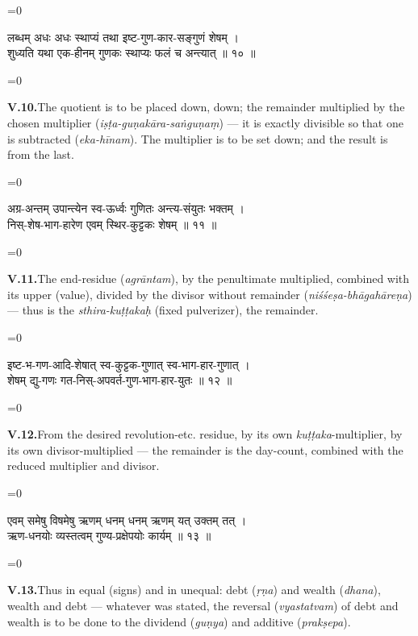 \documentclass[11pt,a4paper]{article}
\newcommand{\dev}[1]{{\devanagarifont\color{sktcolor}#1}}
\newcommand{\iast}[1]{\textit{#1}}
\newenvironment{paracol}[1]{\begingroup}{\endgroup}
\newcommand{\switchcolumn}[1][]{%
  \ifnum#1=0\relax\else\par\nobreak\vspace{0.5em}\par\nobreak\fi%
}
\begin{document}
\vspace{0.3cm}

\begin{paracol}{2}
\switchcolumn[0]
\dev{%
लब्धम् अधः अधः स्थाप्यं तथा इष्ट-गुण-कार-सङ्गुणं शेषम् ।\\
शुध्यति यथा एक-हीनम् गुणकः स्थाप्यः फलं च अन्त्यात् ॥ १० ॥
}

\switchcolumn[1]
\textbf{V.10.}\quad The quotient is to be placed down, down; the
remainder multiplied by the chosen multiplier
(\iast{iṣṭa-guṇakāra-saṅguṇaṃ}) — it is exactly divisible so that
one is subtracted (\iast{eka-hīnam}). The multiplier is to be set
down; and the result is from the last.
\end{paracol}

\vspace{0.3cm}

\begin{paracol}{2}
\switchcolumn[0]
\dev{%
अग्र-अन्तम् उपान्त्येन स्व-ऊर्ध्वः गुणितः अन्त्य-संयुतः भक्तम् ।\\
निस्-शेष-भाग-हारेण एवम् स्थिर-कुट्टकः शेषम् ॥ ११ ॥
}

\switchcolumn[1]
\textbf{V.11.}\quad The end-residue (\iast{agrāntam}), by the
penultimate multiplied, combined with its upper (value), divided by
the divisor without remainder (\iast{niśśeṣa-bhāgahāreṇa}) — thus
is the \iast{sthira-kuṭṭakaḥ} (fixed pulverizer), the remainder.
\end{paracol}

\vspace{0.3cm}

\begin{paracol}{2}
\switchcolumn[0]
\dev{%
इष्ट-भ-गण-आदि-शेषात् स्व-कुट्टक-गुणात् स्व-भाग-हार-गुणात् ।\\
शेषम् द्यु-गणः गत-निस्-अपवर्त-गुण-भाग-हार-युतः ॥ १२ ॥
}

\switchcolumn[1]
\textbf{V.12.}\quad From the desired revolution-etc. residue, by its
own \iast{kuṭṭaka}-multiplier, by its own divisor-multiplied — the
remainder is the day-count, combined with the reduced multiplier
and divisor.
\end{paracol}

\vspace{0.3cm}

\begin{paracol}{2}
\switchcolumn[0]
\dev{%
एवम् समेषु विषमेषु ऋणम् धनम् धनम् ऋणम् यत् उक्तम् तत् ।\\
ऋण-धनयोः व्यस्तत्वम् गुण्य-प्रक्षेपयोः कार्यम् ॥ १३ ॥
}

\switchcolumn[1]
\textbf{V.13.}\quad Thus in equal (signs) and in unequal: debt
(\iast{ṛṇa}) and wealth (\iast{dhana}), wealth and debt — whatever
was stated, the reversal (\iast{vyastatvam}) of debt and wealth is
to be done to the dividend (\iast{guṇya}) and additive
(\iast{prakṣepa}).
\end{paracol}
\end{document}
